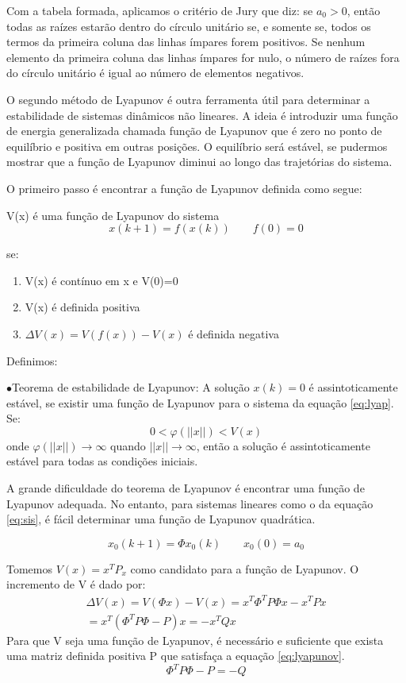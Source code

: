 Com a tabela formada, aplicamos o critério de Jury que diz: se $a_0>0$, então todas as raízes estarão dentro do círculo unitário se, e somente se, todos os termos da primeira coluna das linhas ímpares forem positivos. Se nenhum elemento da primeira coluna das linhas ímpares for nulo, o número  de raízes fora do círculo unitário é igual ao número de elementos negativos.

O segundo método de Lyapunov é outra ferramenta útil para determinar a estabilidade de sistemas dinâmicos não lineares. A ideia é introduzir uma função de energia generalizada chamada função de Lyapunov que é zero no ponto de equilíbrio e positiva em outras posições. O equilíbrio será estável, se pudermos mostrar que a função de Lyapunov diminui ao longo das trajetórias do sistema.


O primeiro passo é encontrar a função de Lyapunov definida como segue:


V(x) é uma função de Lyapunov do sistema
\begin{equation}\label{eq:lyap}
x(k+1)=f(x(k)) \qquad f(0)=0
\end{equation}

se:
\begin{enumerate}
	\item V(x) é contínuo em x e V(0)=0
	\item V(x) é definida positiva
	\item $\Delta V(x)=V(f(x))-V(x)$ é definida negativa
\end{enumerate}

Definimos:


$\bullet$Teorema de estabilidade de Lyapunov: A solução $x(k)=0$ é assintoticamente estável, se existir uma função de Lyapunov para o sistema da equação \eqref{eq:lyap}. Se:
\begin{equation}
0<\varphi(||x||)<V(x)
\end{equation}
onde $\varphi(||x||)\to \infty$ quando $||x|| \to \infty$, então a solução é assintoticamente estável para todas as condições iniciais.


A grande dificuldade do teorema de Lyapunov é encontrar uma função de Lyapunov adequada. No entanto, para sistemas lineares como o da equação \eqref{eq:sis}, é fácil determinar uma função de Lyapunov quadrática.

\begin{equation} \label{eq:sis}
x_0(k+1)=\Phi x_0(k) \qquad x_0(0)=a_0
\end{equation}

Tomemos $V(x)=x^TP_x$ como candidato para a função de Lyapunov. O incremento de V é dado por:
\begin{equation}
\begin{array}{c}
\Delta V(x)=V(\Phi x)-V(x)=x^T\Phi ^T P \Phi x-x^TPx\\
=x^T(\Phi ^T P \Phi -P)x=-x^TQx
\end{array}
\end{equation}
Para que V seja uma função de Lyapunov, é necessário e suficiente que exista uma matriz definida positiva P que satisfaça a equação \eqref{eq:lyapunov}.
\begin{equation}\label{eq:lyapunov}
\Phi ^T P \Phi - P= -Q
\end{equation}

